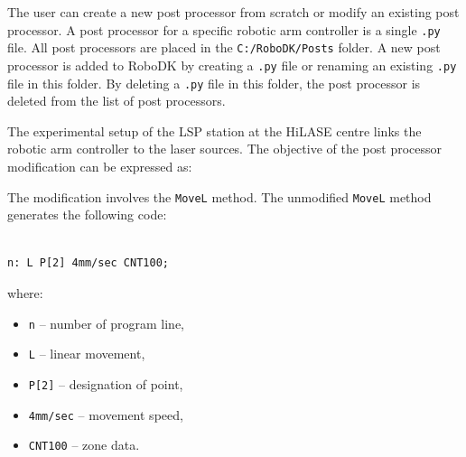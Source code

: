 The user can create a new post processor from scratch or modify an existing post processor. A post processor for a specific robotic arm controller is a single \texttt{.py} file. All post processors are placed in the \texttt{C:/RoboDK/Posts} folder. A new post processor is added to RoboDK by creating a \texttt{.py} file or renaming an existing \texttt{.py} file in this folder. By deleting a \texttt{.py} file in this folder, the post processor is deleted from the list of post processors. 

The experimental setup of the LSP station at the HiLASE centre links the robotic arm controller to the laser sources. The objective of the post processor modification can be expressed as:



The modification involves the \texttt{MoveL} method. The unmodified \texttt{MoveL} method generates the following code:


\begin{verbatim}

n: L P[2] 4mm/sec CNT100;

\end{verbatim}


where:

\begin{itemize}

    \item \texttt{n} -- number of program line, 
    \item \texttt{L} -- linear movement,
    \item \texttt{P[2]} -- designation of point,
    \item \texttt{4mm/sec} -- movement speed,
    \item \texttt{CNT100} -- zone data.

\end{itemize}

